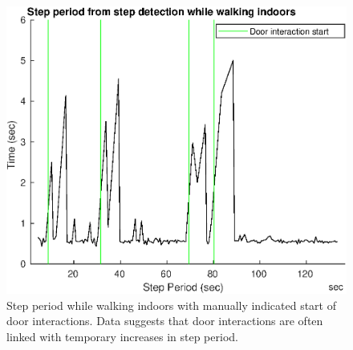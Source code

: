 \begin{figure}[H]
	\centering
	\includegraphics[width=0.55\linewidth]{images/20201122_1605_Step_period_from_step_detection_while_walking_indoors}
		\setlength{\belowcaptionskip}{-30pt}
	\caption{Step period while walking indoors with manually indicated start of door interactions. Data suggests that door interactions are often linked with temporary increases in step period.}
	\label{fig:step_period_from_step_detection_while_walking_indoors}
\end{figure}

